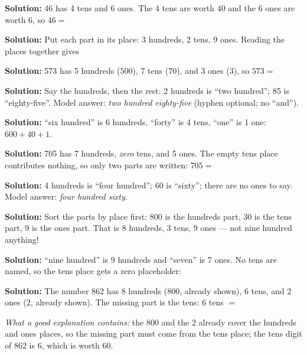 \documentclass[12pt]{article}
\begin{document}



\textbf{Solution:} 46 has 4 tens and 6 ones. The 4 tens are worth $40$ and the
6 ones are worth $6$, so $46 = {}$ 


\textbf{Solution:} Put each part in its place: 3 hundreds, 2 tens, 9 ones.
Reading the places together gives 


\textbf{Solution:} 573 has 5 hundreds ($500$), 7 tens ($70$), and 3 ones
($3$), so $573 = {}$ 


\textbf{Solution:} Say the hundreds, then the rest: 2 hundreds is ``two
hundred''; 85 is ``eighty-five''. Model answer: \emph{two hundred
eighty-five} (hyphen optional; no ``and'').


\textbf{Solution:} ``six hundred'' is 6 hundreds, ``forty'' is 4 tens,
``one'' is 1 one: $600 + 40 + 1$. 


\textbf{Solution:} 705 has 7 hundreds, \emph{zero} tens, and 5 ones. The
empty tens place contributes nothing, so only two parts are written:
$705 = {}$ 


\textbf{Solution:} 4 hundreds is ``four hundred''; 60 is ``sixty''; there are
no ones to say. Model answer: \emph{four hundred sixty}.


\textbf{Solution:} Sort the parts by place first: $800$ is the hundreds part,
$30$ is the tens part, $9$ is the ones part. That is 8 hundreds, 3 tens,
9 ones --- not nine hundred anything! 


\textbf{Solution:} ``nine hundred'' is 9 hundreds and ``seven'' is 7 ones.
No tens are named, so the tens place gets a zero placeholder: 


\textbf{Solution:} The number 862 has 8 hundreds ($800$, already shown),
6 tens, and 2 ones ($2$, already shown). The missing part is the tens:
$6$ tens $= {}$ 

\emph{What a good explanation contains:} the 800 and the 2 already cover the
hundreds and ones places, so the missing part must come from the tens place;
the tens digit of 862 is 6, which is worth 60.
\end{document}
